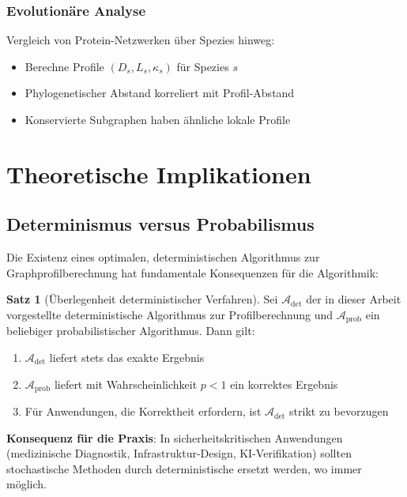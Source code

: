 ﻿\documentclass[a4paper,12pt]{article}
\theoremstyle{definition}
\newtheorem{satz}{Satz}
\begin{document}
	\subsubsection{Evolutionäre Analyse}
	
	Vergleich von Protein-Netzwerken über Spezies hinweg:
	
	\begin{itemize}
		\item[-] Berechne Profile $(D_s, L_s, \kappa_s)$ für Spezies $s$
		\item[-] Phylogenetischer Abstand korreliert mit Profil-Abstand
		\item[-] Konservierte Subgraphen haben ähnliche lokale Profile
	\end{itemize}
	
	\section{Theoretische Implikationen}
	
	\subsection{Determinismus versus Probabilismus}
	
	Die Existenz eines optimalen, deterministischen Algorithmus zur Graphprofilberechnung hat fundamentale Konsequenzen für die Algorithmik:
	
	\begin{satz}[Überlegenheit deterministischer Verfahren]
		Sei $\mathcal{A}_{\text{det}}$ der in dieser Arbeit vorgestellte deterministische Algorithmus zur Profilberechnung und $\mathcal{A}_{\text{prob}}$ ein beliebiger probabilistischer Algorithmus. Dann gilt:
		\begin{enumerate}
			\item $\mathcal{A}_{\text{det}}$ liefert stets das exakte Ergebnis
			\item $\mathcal{A}_{\text{prob}}$ liefert mit Wahrscheinlichkeit $p < 1$ ein korrektes Ergebnis
			\item Für Anwendungen, die Korrektheit erfordern, ist $\mathcal{A}_{\text{det}}$ strikt zu bevorzugen
		\end{enumerate}
	\end{satz}
	
	\textbf{Konsequenz für die Praxis}: In sicherheitskritischen Anwendungen (medizinische Diagnostik, Infrastruktur-Design, KI-Verifikation) sollten stochastische Methoden durch deterministische ersetzt werden, wo immer möglich.
	
\end{document}
